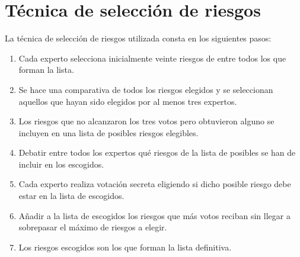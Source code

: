 \documentclass[11pt,a4paper,spanish,twoside]{book}
\begin{document}
\section{Técnica de selección de riesgos}
La técnica de selección de riesgos utilizada consta en los siguientes pasos:
\begin{enumerate}
\item Cada experto selecciona inicialmente veinte riesgos de entre todos los que
  forman la lista.
\item Se hace una comparativa de todos los riesgos elegidos y se seleccionan
  aquellos que hayan sido elegidos por al menos tres expertos.
\item Los riesgos que no alcanzaron los tres votos pero obtuvieron alguno se
  incluyen en una lista de posibles riesgos elegibles. 
\item Debatir entre todos los expertos qué riesgos de la lista de posibles se 
han de incluir en los escogidos. 
\item Cada experto realiza votación secreta eligiendo si dicho posible riesgo 
debe estar en la lista de escogidos.
\item Añadir a la lista de escogidos los riesgos que más votos reciban sin 
llegar a sobrepasar el máximo de riesgos a elegir.
\item Los riesgos escogidos son los que forman la lista definitiva.
\end{enumerate}
\end{document}
